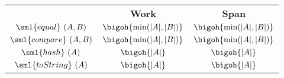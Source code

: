\begin{costspec}[StringElt]
\label{cost:string}
\begin{tabular}{c|c|c}
& \textbf{Work} & \textbf{Span} \\
$\sml{equal}~(A,B)$ & $\displaystyle \bigoh{\min(|A|, |B|)}$ & $\displaystyle \bigoh {\min(|A|, |B|)}$ \\
$\sml{compare}~(A,B)$ & $\displaystyle \bigoh {\min(|A|, |B|)}$ & $\displaystyle \bigoh {\min(|A|, |B|)}$ \\
$\sml{hash}~(A)$ & $\displaystyle \bigoh {|A|}$ & $\displaystyle \bigoh {|A|}$ \\
$\sml{toString}~(A)$ & $\displaystyle \bigoh {|A|}$ & $\displaystyle \bigoh {|A|}$ \\
\end{tabular}
\end{costspec}
    